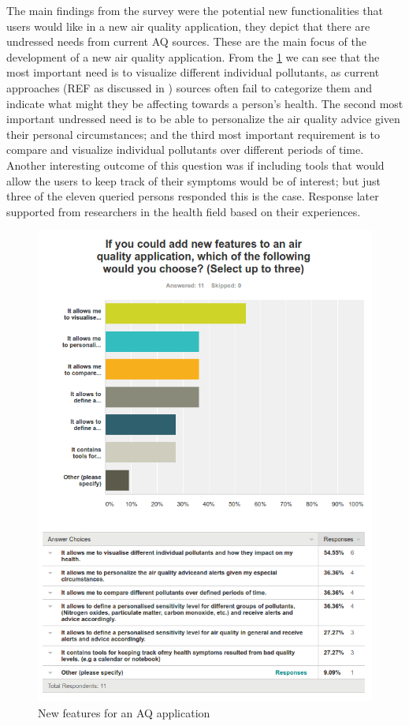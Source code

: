 The main findings from the survey were the potential new functionalities that users would like in a new air quality application, they depict that there are undressed needs from current AQ sources. These are the main focus of the development of a new air quality application. From the \ref{fig:survey_new_features} we can see that the most important need is to visualize different individual pollutants, as current approaches (REF as discussed in ) sources often fail to categorize them and indicate what might they be affecting towards a person's health. The second most important undressed need is to be able to personalize the air quality advice given their personal circumstances; and the third most important requirement is to compare and visualize individual pollutants over different periods of time. Another interesting outcome of this question was if including tools that would allow the users to keep track of their symptoms would be of interest; but just three of the eleven queried persons responded this is the case. Response later supported from researchers in the health field based on their experiences. 


\begin{figure}[H]
\begin{adjustbox}{width=1\textwidth,center=\textwidth}
  \centering
  \includegraphics[scale=1]{images/new_features.png}
\end{adjustbox}
  \caption[New features for an AQ application]{New features for an AQ application}
  \label{fig:survey_new_features}
\end{figure}

